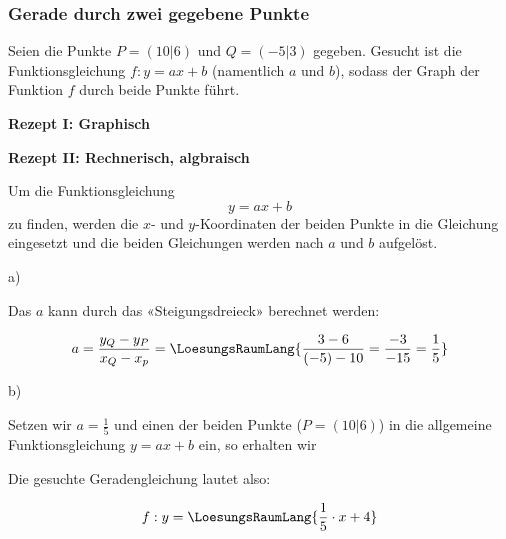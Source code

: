 \subsubsection{Gerade durch zwei gegebene Punkte}

Seien die Punkte $P=(10|6)$ und $Q=(-5|3)$ gegeben.
Gesucht ist die Funktionsgleichung $f: y=ax+b$ (namentlich $a$ und $b$), sodass
der Graph der Funktion $f$ durch beide Punkte führt.


\textbf{Rezept I: Graphisch}\\

\vspace{1mm}




\newpage

\textbf{Rezept II: Rechnerisch, algbraisch }\\

\vspace{1mm}

\begin{rezept}{}{}
Um die Funktionsgleichung $$y=ax+b$$ zu finden,
  werden die $x$- und $y$-Koordinaten der beiden Punkte in die Gleichung eingesetzt und die beiden Gleichungen werden nach $a$ und $b$ aufgelöst. 
\end{rezept}

a)

Das $a$ kann durch das «Steigungsdreieck» berechnet werden:

$$a = \frac{y_Q-y_P}{x_Q-x_p} = \LoesungsRaumLang{\frac{3 - 6}{(-5) - 10} = \frac{-3}{-15} = \frac{1}{5}}$$

b)

Setzen wir $a=\frac{1}{5}$ und einen der beiden Punkte (\zB $P=(10|6)$) in die
allgemeine Funktionsgleichung $y=ax+b$ ein, so erhalten wir


Die gesuchte Geradengleichung lautet also:

$$f: y=\LoesungsRaumLang{\frac{1}{5}\cdot{}x + 4}$$

